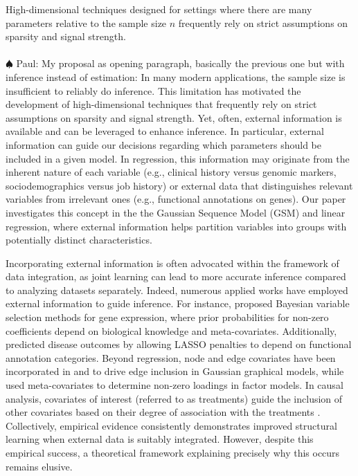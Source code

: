 \documentclass[aos]{imsart}
\theoremstyle{plain}
\newcommand{\paul}[1]{{\small{\color{green} \sf $\spadesuit$ Paul: #1}}}
\begin{document}
High-dimensional techniques designed for settings where there are many parameters relative to the sample size $n$ frequently rely on strict assumptions on sparsity and signal strength.\\
\\
\paul{My proposal as opening paragraph, basically the previous one but with inference instead of estimation:}
In many modern applications, the sample size is insufficient to reliably do inference. This limitation has motivated the development of high-dimensional techniques that frequently rely on strict assumptions on sparsity and signal strength. Yet, often, external information is available and can be leveraged to enhance inference.
In particular, external information can guide our decisions regarding which parameters should be included in a given model. In regression, this information may originate from the inherent nature of each variable (e.g., clinical history versus genomic markers, sociodemographics versus job history) or external data that distinguishes relevant variables from irrelevant ones (e.g., functional annotations on genes). 
Our paper investigates this concept in the the Gaussian Sequence Model (GSM) and linear regression, where external information helps partition variables into groups with potentially distinct characteristics.

Incorporating external information is often advocated within the framework of data integration, as joint learning can lead to more accurate inference compared to analyzing datasets separately. Indeed, numerous applied works have employed external information to guide inference. For instance, \cite{stingo:2011, quintana, cassese:2014} proposed Bayesian variable selection methods for gene expression, where prior probabilities for non-zero coefficients depend on biological knowledge and meta-covariates. Additionally, \cite{chen_tinghuei:2021} predicted disease outcomes by allowing LASSO penalties to depend on functional annotation categories. Beyond regression, node and edge covariates have been incorporated in \cite{peterson} and \cite{jewson2023graphical} to drive edge inclusion in Gaussian graphical models, while \cite{schiavon2022generalized} used meta-covariates to determine non-zero loadings in factor models. In causal analysis, covariates of interest (referred to as treatments) guide the inclusion of other covariates based on their degree of association with the treatments \cite{belloni2014inference,antonelli2021bayesian}. Collectively, empirical evidence consistently demonstrates improved structural learning when external data is suitably integrated. However, despite this empirical success, a theoretical framework explaining precisely why this occurs remains elusive.
\end{document}
